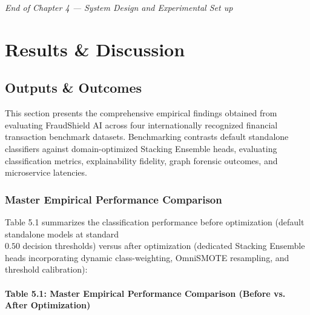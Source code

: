 \documentclass[12pt,a4paper,oneside]{report}
\begin{document}
\textit{End of Chapter 4 --- System Design and Experimental Set up}


\newpage


\chapter{Results \& Discussion}

\section{Outputs \& Outcomes}

This section presents the comprehensive empirical findings obtained from evaluating FraudShield AI across four internationally recognized financial transaction benchmark datasets. Benchmarking contrasts default standalone classifiers against domain-optimized Stacking Ensemble heads, evaluating classification metrics, explainability fidelity, graph forensic outcomes, and microservice latencies.


\subsection{Master Empirical Performance Comparison}

Table 5.1 summarizes the classification performance before optimization (default standalone models at standard \\$0.50$ decision thresholds) versus after optimization (dedicated Stacking Ensemble heads incorporating dynamic class-weighting, OmniSMOTE resampling, and threshold calibration):


\subsubsection{Table 5.1: Master Empirical Performance Comparison (Before vs. After Optimization)}
\end{document}
